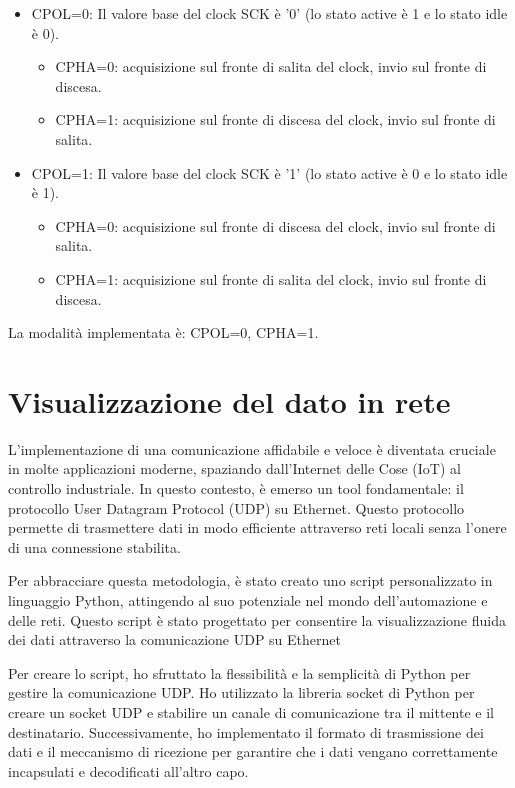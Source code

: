\documentclass[titlepage]{report}
\begin{document}
			\begin{itemize}
			  \item CPOL=0: Il valore base del clock SCK è '0' (lo stato active è 1 e lo stato idle è 0).
				\begin{itemize}
				  \item CPHA=0: acquisizione sul fronte di salita del clock, invio sul fronte di discesa.
				  \item CPHA=1: acquisizione sul fronte di discesa del clock, invio sul fronte di salita.
				\end{itemize}
			  \item CPOL=1: Il valore base del clock SCK è '1' (lo stato active è 0 e lo stato idle è 1).
				\begin{itemize}
				  \item CPHA=0: acquisizione sul fronte di discesa del clock, invio sul fronte di salita.
				  \item CPHA=1: acquisizione sul fronte di salita del clock, invio sul fronte di discesa.
				\end{itemize}
			\end{itemize}
			
			La modalità implementata è: CPOL=0, CPHA=1.

\chapter*{Visualizzazione del dato in rete}
\label{ch:visualizzazione_udp}
	L'implementazione di una comunicazione affidabile e veloce è diventata cruciale in molte applicazioni moderne, spaziando dall'Internet delle Cose (IoT) al controllo industriale. In questo contesto, è emerso un tool fondamentale: il protocollo User Datagram Protocol (UDP) su Ethernet. Questo protocollo permette di trasmettere dati in modo efficiente attraverso reti locali senza l'onere di una connessione stabilita.

	Per abbracciare questa metodologia, è stato creato uno script personalizzato in linguaggio Python, attingendo al suo potenziale nel mondo dell'automazione e delle reti. Questo script è stato progettato per consentire la visualizzazione fluida dei dati attraverso la comunicazione UDP su Ethernet

	Per creare lo script, ho sfruttato la flessibilità e la semplicità di Python per gestire la comunicazione UDP. Ho utilizzato la libreria socket di Python per creare un socket UDP e stabilire un canale di comunicazione tra il mittente e il destinatario. Successivamente, ho implementato il formato di trasmissione dei dati e il meccanismo di ricezione per garantire che i dati vengano correttamente incapsulati e decodificati all'altro capo.
\end{document}
